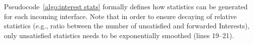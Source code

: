 \documentclass[10pt,conference]{IEEEtran}
\begin{document}


Pseudocode~\ref{algo:interest stats} formally defines how statistics can be generated for  each incoming interface. Note that in order to ensure decaying of relative statistics (e.g., ratio between the number of unsatisfied and forwarded Interests), only unsatisfied statistics needs to be exponentially smoothed (lines 19--21).  


\end{document}
